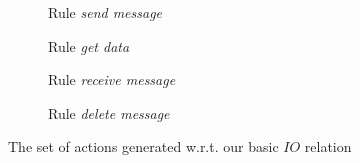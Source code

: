 \begin{figure}[!ht]
  \centering
  \begin{subfigure}[t]{.5\textwidth}
    \centerline{}
    \caption{Rule \emph{send message}}
  \end{subfigure}
  \begin{subfigure}[t]{.5\textwidth}
    \centerline{}
    \caption{Rule \emph{get data}}
  \end{subfigure}
  \begin{subfigure}[t]{.5\textwidth}
    \centerline{}
    \caption{Rule \emph{receive message}}
  \end{subfigure}
  \begin{subfigure}[t]{.5\textwidth}
    \centerline{}
    \caption{Rule \emph{delete message}}
  \end{subfigure}
  \caption{The set of actions generated w.r.t. our basic $IO$ relation}\label{fig:tests:actions}
\end{figure}

